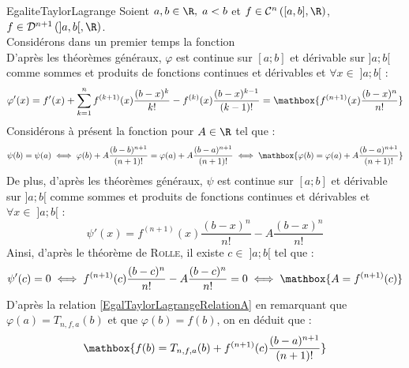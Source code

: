 \documentclass[12pt,a4paper]{report}
\begin{document}
\begin{demonstration}{EgaliteTaylorLagrange}
    Soient $a,b \in \R, \; a < b$ et $f \in \mathcal{C}^n \left([a,b], \R\right)$, $f \in \mathcal{D}^{n+1} \left(]a,b[, \R\right)$.\\
    Considérons dans un premier temps la fonction \\
    D'après les théorèmes généraux, $\varphi$ est continue sur $[a;b]$ et dérivable sur $]a;b[$ comme sommes et produits de fonctions continues et dérivables et $\forall x \in \; ]a;b[$ :
    $$ \varphi'(x) = f'(x) + \sum_{k=1}^n f^{(k+1)}(x) \dfrac{(b-x)^k}{k!} - f^{(k)}(x) \dfrac{(b-x)^{k-1}}{(k-1)!} =  \mathbox{f^{(n+1)}(x) \dfrac{(b-x)^n}{n!}} $$
    Considérons à présent la fonction  pour $A \in \R$ tel que :
    \begin{align}
    \psi(b) = \psi(a) \; \Longleftrightarrow \; \varphi(b) + A\dfrac{(b-b)^{n+1}}{(n+1)!} = \varphi(a) + A\dfrac{(b-a)^{n+1}}{(n+1)!} \; \Longleftrightarrow \; \mathbox{\varphi(b) = \varphi(a) + A\dfrac{(b-a)^{n+1}}{(n+1)!}} \label{EgalTaylorLagrangeRelationA}
    \end{align}
    De plus, d'après les théorèmes généraux, $\psi$ est continue sur $[a;b]$ et dérivable sur $]a;b[$ comme sommes et produits de fonctions continues et dérivables et $\forall x \in \; ]a;b[$ :
    $$ \psi'(x) = f^{(n+1)}(x) \dfrac{(b-x)^n}{n!} - A \dfrac{(b-x)^n}{n!} $$
    Ainsi, d'après le théorème de \textsc{Rolle}, il existe $c \in \; ]a;b[$ tel que :
    $$ \psi'(c) = 0 \; \Longleftrightarrow \; f^{(n+1)}(c) \dfrac{(b-c)^n}{n!} - A \dfrac{(b-c)^n}{n!} = 0 \; \Longleftrightarrow \; \mathbox{A = f^{(n+1)}(c)} $$
    D'après la relation \ref{EgalTaylorLagrangeRelationA} en remarquant que $\varphi(a) = T_{n,f,a}(b)$ et que $\varphi(b) = f(b)$, on en déduit que :
    $$ \mathbox{f(b) = T_{n,f,a}(b) + f^{(n+1)}(c)\dfrac{(b-a)^{n+1}}{(n+1)!}} $$
\end{demonstration}
\end{document}
